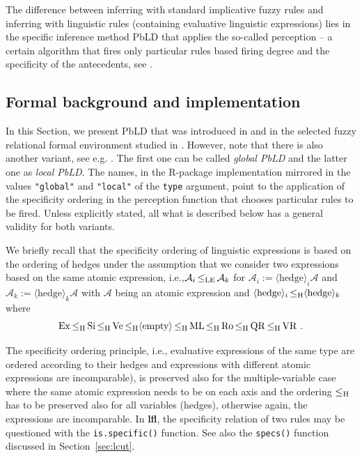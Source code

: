 \documentclass[review]{elsarticle}
\newcommand{\pkg}[1]{\textbf{#1}}
\newcommand{\proglang}[1]{#1}
\newcommand{\code}[1]{\texttt{#1}}
\def\lh{\mathop{\le_{\rm H} }\nolimits}
\newcommand{\mlingterm}[1]{\langle\text{#1}\rangle}
\def\lh{\mathop{\le_{\rm H} }\nolimits}
\def\lle{\mathop{\le_{\rm LE} }\nolimits}
\def\lle{\mathop{\le_{\rm LE} }\nolimits}
\begin{document}
The difference between inferring with  standard implicative fuzzy rules and inferring with
linguistic rules (containing evaluative linguistic expressions) lies in the specific inference method PbLD that applies the so-called perception -- a certain algorithm that fires only particular rules based firing degree and the specificity of the antecedents, see \cite{novper:intellig04}.

 
 \subsection{Formal background and implementation}


In this Section, we present PbLD that was introduced in \cite{Novak:PbLD} and in the selected fuzzy relational formal environment studied in \cite{Dvorak_etal:RedundancyFSS}. However, note that there is 
also another variant, see e.g. \cite{DvoStep:PbLD2015}. The first one can be called \emph{global PbLD} and the latter one as \emph{local PbLD}. The names, in the \proglang{R}-package implementation mirrored in the values \code{"global"} and \code{"local"} of the \code{type} argument, point to the application of the specificity ordering in the perception function that chooses particular rules to be fired. Unless explicitly stated, all what is described below has a general validity for both variants.



We briefly recall that the specificity ordering of linguistic expressions is based on the ordering of hedges under the assumption that we consider two expressions based on the same atomic expression, i.e.,$
\mathcal{A}_i \lle \mathcal{A}_k$
for  $\mathcal{A}_i:= \mlingterm{hedge}_i
\mathcal{A}$ and $\mathcal{A}_k:= \mlingterm{hedge}_k \mathcal{A}$ with $\mathcal{A}$ being an atomic expression and
$\mlingterm{hedge}_i\lh \mlingterm{hedge}_k$ where
\begin{equation*}
\mathrm{Ex}\lh  \mathrm{Si} \lh \mathrm{Ve}\lh \mlingterm{empty}\lh
\mathrm{ML}\lh \mathrm{Ro}\lh  \mathrm{QR} 
\lh \mathrm{VR} \ .
\end{equation*}

The specificity ordering principle, i.e., evaluative expressions of the same type are ordered according to their hedges and expressions with different atomic expressions are incomparable), is preserved also for the multiple-variable case where the same atomic expression needs to be on each axis and the ordering $\lh$ has to be preserved also for all variables (hedges), otherwise again, the expressions are incomparable. In \pkg{lfl}, the specificity relation of two rules may be questioned with the \code{is.specific()} function. See also the \code{specs()} function discussed in Section~\ref{sec:lcut}.
\end{document}
